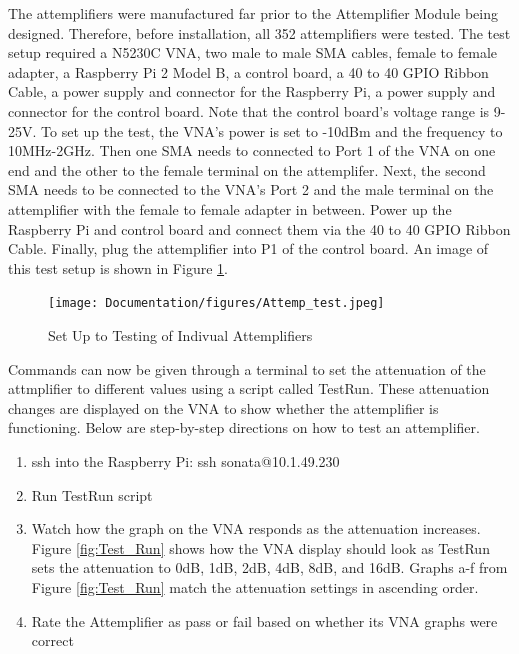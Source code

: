 \documentclass[12pt,a4paper,oneside]{article}
\begin{document}
The attemplifiers were manufactured far prior to the Attemplifier Module being designed. Therefore, before installation, all 352 attemplifiers were tested. The test setup required a N5230C VNA, two male to male SMA cables, female to female adapter, a Raspberry Pi 2 Model B, a control board, a 40 to 40 GPIO Ribbon Cable, a power supply and connector for the Raspberry Pi, a power supply and connector for the control board. Note that the control board's voltage range is 9-25V. To set up the test, the VNA's power is set to -10dBm and the frequency to 10MHz-2GHz.  Then one SMA needs to connected to Port 1 of the VNA on one end and the other to the female terminal on the attemplifer. Next, the second SMA needs to be connected to the VNA's Port 2 and the male terminal on the attemplifier with the female to female adapter in between. Power up the Raspberry Pi and control board and connect them via the 40 to 40 GPIO Ribbon Cable. Finally, plug the attemplifier into P1 of the control board. An image of this test setup is shown in Figure \ref{fig:Attemp_test}. 

%
\begin{figure}[H]
\centering
\texttt{[image: Documentation/figures/Attemp\_test.jpeg]}
\caption{Set Up to Testing of Indivual Attemplifiers}
\label{fig:Attemp_test}
\end{figure}
%


Commands can now be given through a terminal to set the attenuation of the attmplifier to different values using a script called TestRun. These attenuation changes are displayed on the VNA to show whether the attemplifier is functioning. Below are step-by-step directions on how to test an attemplifier.

\begin{enumerate}
 \item ssh into the Raspberry Pi: ssh sonata@10.1.49.230
 \item Run TestRun script
 \item Watch how the graph on the VNA responds as the attenuation increases. Figure \ref{fig:Test_Run} shows how the VNA display should look as TestRun sets the attenuation to 0dB, 1dB, 2dB, 4dB, 8dB, and 16dB.  Graphs a-f from Figure \ref{fig:Test_Run} match the attenuation settings in ascending order. 

 \item Rate the Attemplifier as pass or fail based on whether its VNA graphs were correct
 
\end{enumerate}
\end{document}
